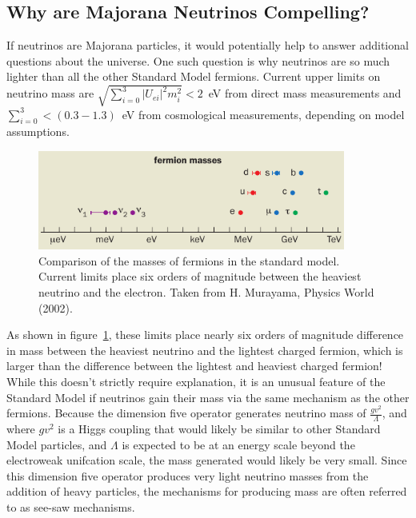 \documentclass[/main.tex]{subfiles}
\begin{document}
\subsection{Why are Majorana Neutrinos Compelling?} \label{sec:implications}
If neutrinos are Majorana particles, it would potentially help to answer additional questions about the universe.
One such question is why neutrinos are so much lighter than all the other Standard Model fermions.
Current upper limits on neutrino mass are $\sqrt{\sum_{i=0}^{3}|U_{ei}|^2m_i^2}<2$~eV from direct mass measurements and $\sum_{i=0}^3<(0.3-1.3)$~eV from cosmological measurements, depending on model assumptions\cite{PDG2018}.
\begin{figure}[t]
  \centering
  \includegraphics[width=0.9\textwidth]{numasssmall}
  \caption[Mass of Standard Model Fermions]{\label{fig:SMfermionmasses}
    Comparison of the masses of fermions in the standard model. Current limits place six orders of magnitude between the heaviest neutrino and the electron. Taken from H. Murayama, Physics World (2002).
  }
\end{figure}
As shown in figure~\ref{fig:SMfermionmasses}, these limits place nearly six orders of magnitude difference in mass between the heaviest neutrino and the lightest charged fermion, which is larger than the difference between the lightest and heaviest charged fermion!
While this doesn't strictly require explanation, it is an unusual feature of the Standard Model if neutrinos gain their mass via the same mechanism as the other fermions.
Because the dimension five operator generates neutrino mass of $\frac{gv^2}{\Lambda}$, and where $gv^2$ is a Higgs coupling that would likely be similar to other Standard Model particles, and $\Lambda$ is expected to be at an energy scale beyond the electroweak unifcation scale, the mass generated would likely be very small.
Since this dimension five operator produces very light neutrino masses from the addition of heavy particles, the mechanisms for producing mass are often referred to as see-saw mechanisms.
\end{document}
